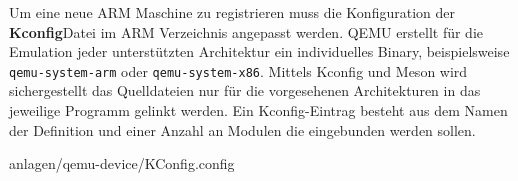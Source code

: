 Um eine neue ARM Maschine zu registrieren muss die Konfiguration der
\textbf{Kconfig}\footnotemark[2] Datei im ARM Verzeichnis angepasst werden.
QEMU erstellt für die Emulation jeder unterstützten Architektur ein
individuelles Binary, beispielsweise \texttt{qemu-system-arm} oder
\texttt{qemu-system-x86}.
Mittels Kconfig und Meson wird sichergestellt das Quelldateien nur für die
vorgesehenen Architekturen in das jeweilige Programm gelinkt werden.
Ein Kconfig-Eintrag besteht aus dem Namen der Definition und einer Anzahl an
Modulen die eingebunden werden sollen.


\begin{minipage}{\linewidth}

                {anlagen/qemu-device/KConfig.config}
\end{minipage}

